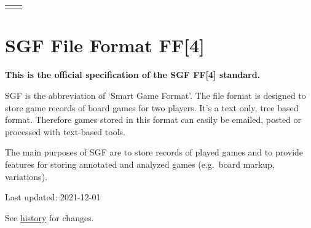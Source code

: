 {\def\LTcaptype{none} %
\begin{longtable}[]{@{}ll@{}}
\toprule\noalign{}
\endhead
\bottomrule\noalign{}
\endlastfoot
\end{longtable}
}

\section{SGF File Format FF{[}4{]}}\label{sgf-file-format-ff4}

\textbf{This is the official specification of the SGF FF{[}4{]}
standard.}

SGF is the abbreviation of `Smart Game Format'. The file format is
designed to store game records of board games for two players. It's a
text only, tree based format. Therefore games stored in this format can
easily be emailed, posted or processed with text-based tools.

The main purposes of SGF are to store records of played games and to
provide features for storing annotated and analyzed games (e.g.~board
markup, variations).

Last updated: 2021-12-01

See \href{https://red-bean.com/sgf/history.html}{history} for changes.

